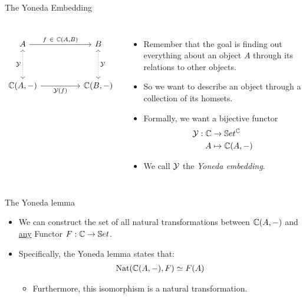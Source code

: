 \begin{frame}[fragile]{The Yoneda Embedding}
	\begin{columns}
		\[\begin{tikzcd}
			A && B \\
			\\
			{\bC(A, -)} && {\bC(B,-)}
			\arrow["{f\ \in\ \mathbb{C}(A,B)}", from=1-1, to=1-3]
			\arrow["{\mathcal{Y}}"', dotted, leftrightarrow, from=1-1, to=3-1]
			\arrow["{\mathcal{Y}}", dotted, leftrightarrow, from=1-3, to=3-3]
			\arrow["{\mathcal{Y}(f)}"', from=3-1, to=3-3]
		\end{tikzcd}\]
		\begin{itemize}
			\item Remember that the goal is finding out everything about an object $A$ through its relations to other objects.
			\pause\item So we want to describe an object through a collection of its homsets.
			\pause\item Formally, we want a bijective functor
			\begin{align*}
				\mathcal{Y} : \mathbb{C} &\to \mathbb{S} et^{\mathbb{C}}\\
				A &\mapsto \mathbb{C}(A,-)
			\end{align*}
			\vspace{-16pt}\pause\item We call $\mathcal{Y}$ the \textit{Yoneda embedding}.
		\end{itemize}
	\end{columns}
\end{frame}
\begin{frame}{The Yoneda lemma}
	\begin{itemize}
		\pause\item We can construct the set of all natural transformations between $\mathbb{C}(A, -)$ and \underline{any} Functor $F :\mathbb{C} \to \mathbb{S} et$.
		\pause\item Specifically, the Yoneda lemma states that:
		\begin{align*}
			\text{Nat}(\mathbb{C}(A,-), F) \simeq F(A)
		\end{align*}
		\begin{itemize}
			\vspace{-18pt}\pause\item Furthermore, this isomorphism is a natural transformation.
		\end{itemize}
	\end{itemize}
\end{frame}

